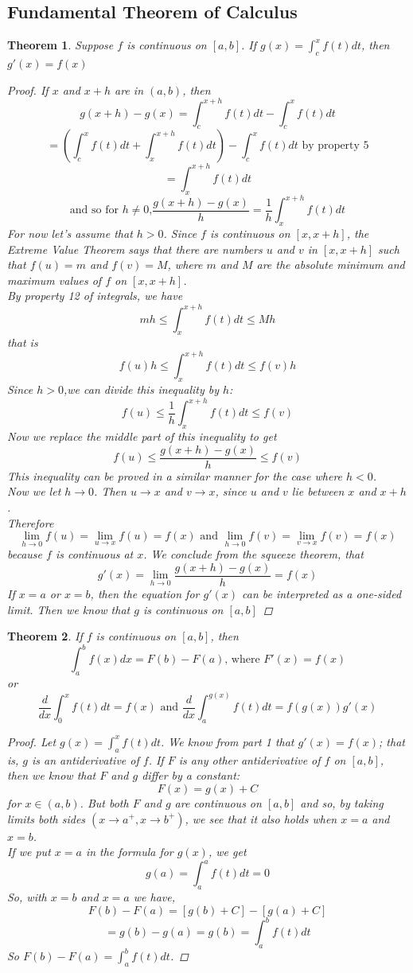 \documentclass[10pt]{report}
\newtheorem{thm3}{Theorem}[subsection]
\begin{document}
\subsection{Fundamental Theorem of Calculus}
\begin{thm3}
Suppose $f$ is continuous on $[a,b]$. If $g(x)=\int_c^xf(t)dt$, then $g'(x)=f(x)$
\begin{proof}
If $x$ and $x+h$ are in $(a,b)$, then
$$g(x+h)-g(x)=\int_c^{x+h}f(t)dt -\int_c^xf(t)dt$$
$$=\left(\int_c^xf(t)dt+ \int_x^{x+h} f(t)dt\right)-\int_c^xf(t)dt\text{ by property 5}$$
$$=\int_x^{x+h}f(t)dt$$
$$\text{and so for $h\neq 0$,} \frac{g(x+h)-g(x)}{h}=\frac{1}{h}\int_x^{x+h}f(t)dt$$
For now let's assume that $h>0$. Since $f$ is continuous on $[x,x+h]$, the Extreme Value Theorem says that there are numbers $u$ and $v$ in $[x, x+h]$ such that $f(u)=m$ and $f(v)=M$, where $m$ and $M$ are the absolute minimum and maximum values of $f$ on $[x, x+h]$.\\
By property 12 of integrals, we have
$$mh\leq \int_x^{x+h}f(t)dt\leq Mh$$
that is
$$f(u)h\leq \int_x^{x+h}f(t)dt\leq f(v)h$$
Since $h>0$,we can divide this inequality by $h$:
$$f(u)\leq \frac{1}{h}\int_x^{x+h}f(t)dt\leq f(v)$$
Now we replace the middle part of this inequality to get
$$f(u)\leq \frac{g(x+h)-g(x)}{h} \leq f(v)$$
This inequality can be proved in a similar manner for the case where $h<0$.\\
Now we let $h\to 0$. Then $u\to x$ and $v\to x$, since $u$ and $v$ lie between $x$ and $x+h$.\\
Therefore
$$\lim_{h\to 0}f(u)=\lim_{u\to x}f(u) =f(x)\text{    and    } \lim_{h\to 0}f(v) =\lim_{v\to x}f(v) =f(x)$$
because $f$ is continuous at $x$. We conclude from the squeeze theorem, that
$$g'(x)=\lim_{h\to 0}\frac{g(x+h)-g(x)}{h}=f(x)$$
If $x=a$ or $x=b$, then the equation for $g'(x)$ can be interpreted as a one-sided limit. Then we know that $g$ is continuous on $[a,b]$
\end{proof}
\end{thm3}
\begin{thm3}
If $f$ is continuous on $[a,b]$, then
$$\int_a^b f(x)dx=F(b)-F(a)\text{, where  } F'(x)=f(x)$$
or
$$\frac{d}{dx}\int_0^x f(t)dt=f(x)\text{ and } \frac{d}{dx}\int_a^{g(x)} f(t)dt=f(g(x))g'(x)$$
\begin{proof}
Let $g(x)=\int_a^xf(t)dt$. We know from part 1 that $g'(x)=f(x)$; that is, $g$ is an antiderivative of $f$. If $F$ is any other antiderivative of $f$ on $[a,b]$, then we know that $F$ and $g$ differ by a constant:
$$F(x)=g(x)+C$$
for $x\in(a,b)$. But both $F$ and $g$ are continuous on $[a,b]$ and so, by taking limits both sides $(x\to a^+, x\to b^+)$, we see that it also holds when $x=a$ and $x=b$.\\
If we put $x=a$ in the formula for $g(x)$, we get
$$g(a)=\int_a^af(t)dt=0$$
So, with $x=b$ and $x=a$ we have,
$$F(b)-F(a)=[g(b)+C]-[g(a)+C]$$
$$=g(b)-g(a)=g(b)=\int_a^bf(t)dt$$
So $F(b)-F(a)=\int_a^b f(t)dt$.
\end{proof}
\end{thm3}
\end{document}
